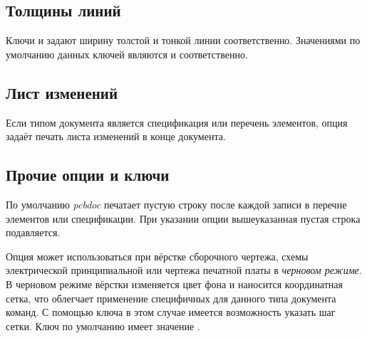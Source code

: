 \subsection{Толщины линий}

Ключи  и  задают ширину толстой и
тонкой линии соответственно. Значениями по умолчанию данных ключей являются
\bfsf{0.6mm} и \bfsf{0.3mm} соответственно.

\subsection{Лист изменений}

Если типом документа является спецификация или перечень элементов, опция
 задаёт печать листа изменений в конце документа.

\subsection{Прочие опции и ключи}

По умолчанию \emph{pcbdoc} печатает пустую строку после каждой записи в перечне
элементов или спецификации. При указании опции  вышеуказанная пустая
строка подавляется.

Опция  может использоваться при вёрстке сборочного чертежа, схемы
электрической принципиальной или чертежа печатной платы в \emph{черновом режиме}. В
черновом режиме вёрстки изменяется цвет фона и наносится координатная сетка, что
облегчает применение специфичных для данного типа документа команд. С помощью ключа
 в этом случае имеется возможность указать шаг сетки. Ключ
 по умолчанию имеет значение \bfsf{10mm}.
